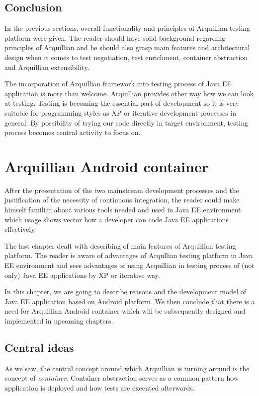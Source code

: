 \documentclass[12pt,final,oneside]{fithesis}
\begin{document}
	\section{Conclusion}
	
In the previous sections, overall functionality and principles of Arquillian testing platform were given. The reader should have solid background regarding principles of Arquillian and he should also grasp main features and architectural design when it comes to test negotiation, test enrichment, container abstraction and Arquillian extensibility.

The incorporation of Arquillian framework into testing process of Java EE application is more than welcome. Arquillian provides other way how we can look at testing. Testing is becoming the essential part of development so it is very suitable for programming styles as XP or iterative development processes in general. By possibility of trying our code directly in target environment, testing process becomes central activity to focus on.

\chapter{Arquillian Android container}

After the presentation of the two mainstream development processes and the justification of the necessity of continuous integration, the reader could make himself familiar about various tools needed and used in Java EE environment which usage shows vector how a developer can code Java EE applications effectively.

The last chapter dealt with describing of main features of Arquillian testing platform. The reader is aware of advantages of Arqullian testing platform in Java EE environment and sees advantages of using Arquillian in testing process of (not only) Java EE applications by XP or iterative way.

In this chapter, we are going to describe reasons and the development model of Java EE application based on Android platform. We then conclude that there is a need for Arquillian Android container which will be subsequently designed and implemented in upcoming chapters.

	\section{Central ideas}

As we saw, the central concept around which Arquillian is turning around is the concept of \textit{container}. Container abstraction serves as a common pattern how application is deployed and how tests are executed afterwards.
\end{document}
